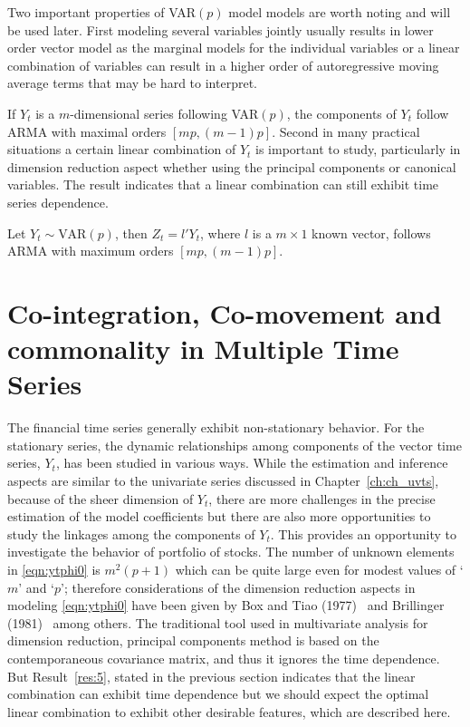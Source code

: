 Two important properties of VAR$(p)$ model models are worth noting and will be used later. First modeling several variables jointly usually results in lower order vector model as the marginal models for the individual variables or a linear combination of variables can result in a higher order of autoregressive moving average terms that may be hard to interpret.


\begin{result} \label{res:5} 
If $Y_t$ is a $m$-dimensional series following VAR$(p)$, the components of $Y_t$ follow ARMA with maximal orders $[mp,(m-1)p]$. Second in many practical situations a certain linear combination of $Y_t$ is important to study, particularly in dimension reduction aspect whether using the principal components or canonical variables. The result indicates that a linear combination can still exhibit time series dependence. 
\end{result}


\begin{result} \label{res:6} 
Let $Y_t \sim \text{VAR}(p)$, then $Z_t= l' Y_t$, where $l$ is a $m \times 1$ known vector, follows ARMA with maximum orders $[mp, (m-1)p]$. 
\end{result}



\section{Co-integration, Co-movement and commonality in Multiple Time Series \label{sec:comts}}


The financial time series generally exhibit non-stationary behavior. For the stationary series, the dynamic relationships among components of the vector time series, $Y_t$, has been studied in various ways. While the estimation and inference aspects are similar to the univariate series discussed in Chapter~\ref{ch:ch_uvts}, because of the sheer dimension of $Y_t$, there are more challenges in the precise estimation of the model coefficients but there are also more opportunities to study the linkages among the components of $Y_t$. This provides an opportunity to investigate the behavior of portfolio of stocks. The number of unknown elements in \eqref{eqn:ytphi0} is $m^2 (p+1)$ which can be quite large even for modest values of `$m$' and `$p$'; therefore considerations of the dimension reduction aspects in modeling \eqref{eqn:ytphi0} have been given by Box and Tiao (1977)~\cite{box77} and Brillinger (1981)~\cite{brill81} among others. The traditional tool used in multivariate analysis for dimension reduction, principal components method is based on the contemporaneous covariance matrix, and thus it ignores the time dependence. But Result~\ref{res:5}, stated in the previous section indicates that the linear combination can exhibit time dependence but we should expect the optimal linear combination to exhibit other desirable features, which are described here. 


